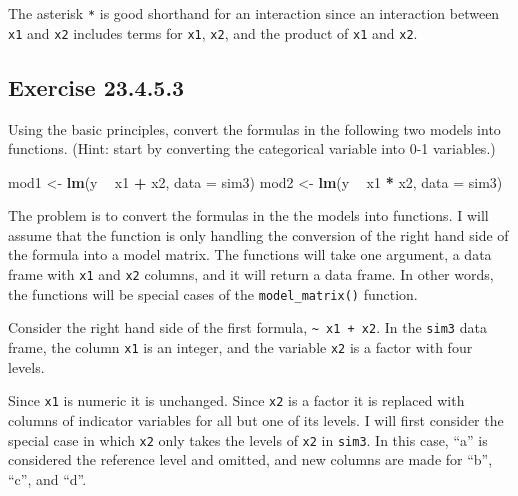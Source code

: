 \documentclass[]{book}
\newenvironment{Shaded}{\begin{snugshade}}{\end{snugshade}}
\newcommand{\CommentTok}[1]{\textcolor[rgb]{0.56,0.35,0.01}{\textit{#1}}}
\newcommand{\DataTypeTok}[1]{\textcolor[rgb]{0.13,0.29,0.53}{#1}}
\newcommand{\KeywordTok}[1]{\textcolor[rgb]{0.13,0.29,0.53}{\textbf{#1}}}
\newcommand{\NormalTok}[1]{#1}
\newcommand{\OperatorTok}[1]{\textcolor[rgb]{0.81,0.36,0.00}{\textbf{#1}}}
\newcommand{\StringTok}[1]{\textcolor[rgb]{0.31,0.60,0.02}{#1}}
\theoremstyle{plain}
\theoremstyle{remark}
\begin{document}
The asterisk \texttt{*} is good shorthand for an interaction since an interaction between \texttt{x1} and \texttt{x2} includes
terms for \texttt{x1}, \texttt{x2}, and the product of \texttt{x1} and \texttt{x2}.

\hypertarget{exercise-23.4.5.3}{%
\subsection*{\texorpdfstring{Exercise {23.4.5.3}}{Exercise 23.4.5.3}}\label{exercise-23.4.5.3}}

Using the basic principles, convert the formulas in the following two models into functions.
(Hint: start by converting the categorical variable into 0-1 variables.)

\begin{Shaded}
\begin{Highlighting}[]
\NormalTok{mod1 <-}\StringTok{ }\KeywordTok{lm}\NormalTok{(y }\OperatorTok{~}\StringTok{ }\NormalTok{x1 }\OperatorTok{+}\StringTok{ }\NormalTok{x2, }\DataTypeTok{data =}\NormalTok{ sim3)}
\NormalTok{mod2 <-}\StringTok{ }\KeywordTok{lm}\NormalTok{(y }\OperatorTok{~}\StringTok{ }\NormalTok{x1 }\OperatorTok{*}\StringTok{ }\NormalTok{x2, }\DataTypeTok{data =}\NormalTok{ sim3)}
\end{Highlighting}
\end{Shaded}

The problem is to convert the formulas in the the models into functions.
I will assume that the function is only handling the conversion of the right hand side of the formula into a model matrix.
The functions will take one argument, a data frame with \texttt{x1} and \texttt{x2} columns,
and it will return a data frame.
In other words, the functions will be special cases of the \texttt{model\_matrix()} function.

Consider the right hand side of the first formula, \texttt{\textasciitilde{}\ x1\ +\ x2}.
In the \texttt{sim3} data frame, the column \texttt{x1} is an integer, and the variable \texttt{x2} is a factor with four levels.

\begin{Shaded}
\end{Shaded}

Since \texttt{x1} is numeric it is unchanged.
Since \texttt{x2} is a factor it is replaced with columns of indicator variables for all but one of its levels.
I will first consider the special case in which \texttt{x2} only takes the levels of \texttt{x2} in \texttt{sim3}.
In this case, ``a'' is considered the reference level and omitted, and new columns are made for ``b'', ``c'', and ``d''.
\end{document}
